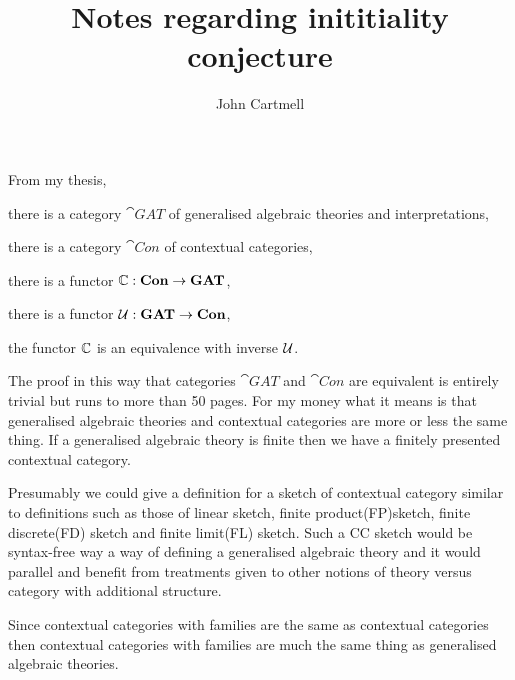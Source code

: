 \documentclass[10pt,a4paper]{article}
\theoremstyle{remark}
\begin{document}
\title{Notes regarding inititiality conjecture}

\author{John Cartmell}

\maketitle

\newcommand{\CofU}{\ccat[C](\gat[U])}
\newcommand{\KU}{K_{\gat[U]}}
\newcommand{\KUp}{K_{\gat[U']}}
\newcommand{\catCon}{\cat{Con}}
\newcommand{\catGAT}{\cat{GAT}}

 



\iffalse
\note From my thesis, 
\begin{point}
there is a category $\catGAT$ of generalised algebraic theories and interpretations,
\end{point}
\begin{point}
there is a category $\catCon$ of contextual categories,
\end{point}
\begin{point}
there is a functor $\ccat[C]: \catCon \morph \catGAT$,
\end{point}
\begin{point}
there is a functor $\gat[U]:\catGAT \morph \catCon$,
\end{point}
\begin{point}
the functor $\ccat[C]$ is an equivalence with inverse $\gat[U]$.
\end{point}

\note
The proof in this way that categories $\catGAT$ and $\catCon$ are equivalent  is entirely trivial but runs to more than 50 pages. For my money what it means is that generalised algebraic theories and contextual categories are more or less the same thing. If a generalised algebraic theory is finite then we have a finitely presented contextual category. 

\note
Presumably we could give a definition for a sketch of contextual category similar to  definitions such as those of linear sketch, finite product(FP)sketch, finite discrete(FD) sketch and finite limit(FL) sketch. Such a CC sketch would be syntax-free way a way of defining a generalised algebraic theory and it would parallel and benefit from treatments given to other notions of theory versus category with additional structure.

\note
Since contextual categories with families are the same as contextual categories then 
contextual categories with families are much the same thing as generalised algebraic theories. 
\end{document}
